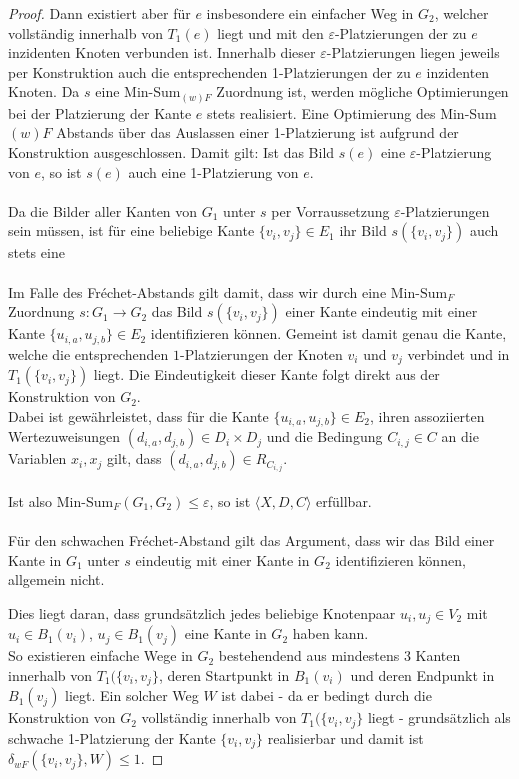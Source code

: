 \documentclass[a4paper, 12pt, twoside]{article}
\theoremstyle{Format1} %
\begin{document}
\begin{proof}
Dann existiert aber für $e$ insbesondere ein einfacher Weg in $G_2$, welcher vollständig innerhalb von $T_1(e)$ liegt und mit den
$\varepsilon$-Platzierungen der zu $e$ inzidenten Knoten verbunden ist. Innerhalb dieser $\varepsilon$-Platzierungen liegen jeweils per Konstruktion auch die
entsprechenden 1-Platzierungen der zu $e$ inzidenten Knoten. Da $s$ eine Min-Sum$_{(w)F}$ Zuordnung ist, werden mögliche Optimierungen bei der Platzierung
der Kante $e$ stets realisiert. Eine Optimierung des Min-Sum${(w)F}$ Abstands
über das Auslassen einer 1-Platzierung ist aufgrund der Konstruktion ausgeschlossen.
Damit gilt: Ist das Bild $s(e)$ eine $\varepsilon$-Platzierung von $e$, so ist $s(e)$ auch eine 1-Platzierung von $e$.
\\
\\
Da die Bilder aller Kanten von $G_1$ unter $s$ per Vorraussetzung $\varepsilon$-Platzierungen sein müssen, ist für eine beliebige Kante $\{v_i, v_j\} \in E_1$
ihr Bild $s(\{v_i, v_j\})$ auch stets eine 
\\
\\
Im Falle des Fréchet-Abstands gilt damit, dass wir durch eine $\text{Min-Sum}_F$ Zuordnung $s: G_1 \to G_2$ das Bild $s(\{v_i, v_j\})$ einer Kante
eindeutig mit einer Kante $\{u_{i,a}, u_{j,b}\} \in E_2$ identifizieren können. Gemeint ist damit genau die Kante, welche
die entsprechenden $1$-Platzierungen der Knoten $v_i$ und $v_j$ verbindet und in $T_1(\{v_i, v_j\})$ liegt. Die Eindeutigkeit dieser Kante folgt direkt aus der
Konstruktion von $G_2$.
\\
Dabei ist gewährleistet, dass für die Kante $\{u_{i,a}, u_{j,b}\} \in E_2$, ihren assoziierten Wertezuweisungen $(d_{i,a}, d_{j,b}) \in D_i \times D_j$
und die Bedingung $C_{i,j} \in C$ an die Variablen $x_i, x_j$ gilt, dass $(d_{i,a},d_{j,b}) \in R_{C_{i,j}}$.
\\
\\
Ist also Min-Sum$_F(G_1,G_2) \leq \varepsilon$, so ist $\langle X,D,C \rangle$ erfüllbar.
\\
\\
Für den schwachen Fréchet-Abstand gilt das Argument, dass wir das Bild einer Kante in $G_1$ unter $s$ eindeutig mit einer Kante in $G_2$ identifizieren können, allgemein nicht.

Dies liegt daran, dass grundsätzlich jedes beliebige Knotenpaar $u_{i}, u_{j} \in V_2$ mit $u_{i} \in B_1(v_i)$, $u_{j} \in B_1(v_j)$ eine Kante in $G_2$ haben kann.
\\
So existieren einfache Wege in $G_2$ bestehendend aus mindestens 3 Kanten innerhalb von $T_1(\{v_i, v_j\}$, deren Startpunkt in $B_1(v_i)$ und deren Endpunkt in $B_1(v_j)$ liegt.
Ein solcher Weg $W$ ist dabei - da er bedingt durch die Konstruktion von $G_2$ vollständig innerhalb von $T_1(\{v_i, v_j\}$ liegt - grundsätzlich als
schwache 1-Platzierung der Kante $\{v_i, v_j\}$ realisierbar und damit ist $\delta_{wF}(\{v_i, v_j\}, W) \leq 1$.


\end{proof}
\end{document}
